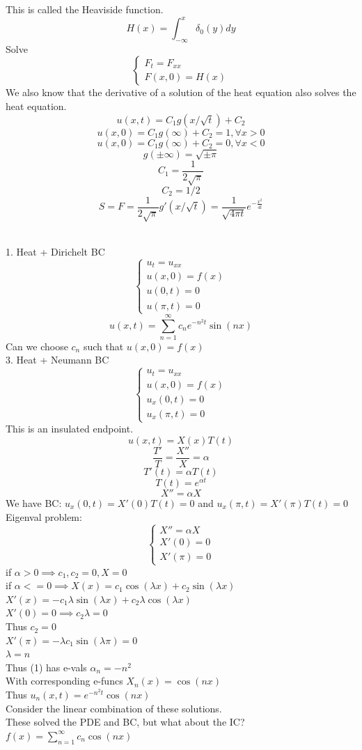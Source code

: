 \documentclass{article}
\begin{document}
This is called the Heaviside function.\\
$$ H(x) = \int_{-\infty}^{x} \delta_0(y) dy$$
Solve 
$$\begin{cases}
    F_t = F_{xx}\\
    F(x,0) = H(x)
\end{cases}$$
We also know that the derivative of a solution of the heat equation also solves the heat equation.
$$ u(x,t) = C_1 g(x/\sqrt{t}) + C_2$$
$$ u(x,0) = C_1 g(\infty) + C_2 = 1, \forall x >0$$
$$ u(x,0) = C_1 g(\infty) + C_2 = 0, \forall x < 0$$
$$ g(\pm \infty) = \sqrt{\pm \pi}$$
$$ C_1 = \frac{1}{2\sqrt{\pi}}$$
$$ C_2 = 1/2$$
$$ S = F = \frac{1}{2\sqrt{\pi}} g'(x/\sqrt{t})= \frac{1}{\sqrt{4\pi t}} e^{-\frac{x^2}{4t}}$$

\textbf{}\\

1. Heat + Dirichelt BC 
$$\begin{cases}
    u_t = u_{xx}\\
    u(x,0) = f(x)\\
    u(0,t) = 0\\
    u(\pi,t) = 0
\end{cases}
$$
$$ u(x,t) = \sum_{n=1}^{\infty} c_n e^{-n^2t} \sin(nx)$$
Can we choose $c_n$ such that $u(x,0) = f(x)$\\
3. Heat + Neumann BC
$$\begin{cases}
    u_t = u_{xx}\\
    u(x,0) = f(x)\\
    u_x(0,t) = 0\\
    u_x(\pi,t) = 0
\end{cases}$$
This is an insulated endpoint.
$$u(x,t) = X(x)T(t)$$
$$\frac{T'}{T} = \frac{X''}{X} = \alpha$$
$$T'(t) = \alpha T(t)$$
$$ T(t) = e^{\alpha t}$$
$$ X'' = \alpha X$$
We have BC: $u_x(0,t) = X'(0)T(t) = 0$ and $u_x(\pi,t) = X'(\pi)T(t) = 0$\\
Eigenval problem:
$$\begin{cases}
    X'' = \alpha X\\
    X'(0) = 0\\
    X'(\pi) = 0
\end{cases}
$$
if $\alpha > 0 \implies c_1,c_2=0, X = 0$\\
if $\alpha <= 0 \implies X(x) = c_1 \cos(\lambda x) + c_2 \sin(\lambda x)$\\
$X'(x) = -c_1 \lambda \sin(\lambda x) + c_2 \lambda \cos(\lambda x)$\\
$X'(0) = 0 \implies c_2 \lambda = 0$\\
Thus $c_2 = 0$\\
$X'(\pi) = -\lambda c_1 \sin(\lambda \pi) = 0$\\
$\lambda = n$\\
Thus (1) has e-vals $\alpha_n = -n^2$\\
With corresponding e-funcs $X_n(x) = \cos(nx)$\\
Thus $u_n(x,t) = e^{-n^2t} \cos(nx)$\\
Consider the linear combination of these solutions.\\
These solved the PDE and BC, but what about the IC?
$f(x) = \sum_{n=1}^{\infty} c_n \cos(nx)$\\
\end{document}
